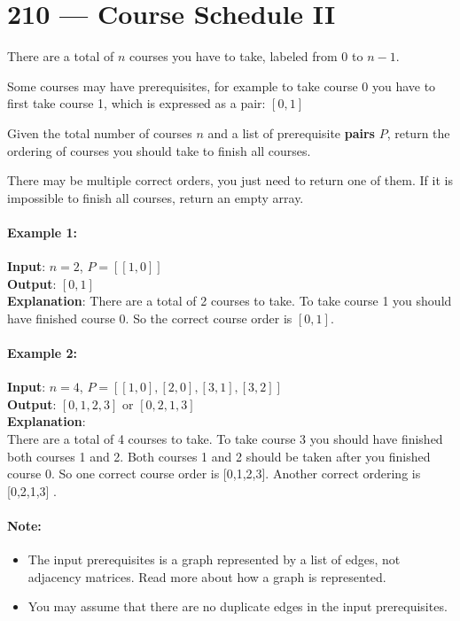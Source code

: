 \section{210 --- Course Schedule II}
There are a total of $n$ courses you have to take, labeled from 0 to $n-1$.

Some courses may have prerequisites, for example to take course 0 you have to first take course 1, which is expressed as a pair: $[0,1]$

Given the total number of courses $n$ and a list of prerequisite \textbf{pairs} $P$, return the ordering of courses you should take to finish all courses.

There may be multiple correct orders, you just need to return one of them. If it is impossible to finish all courses, return an empty array.

\paragraph{Example 1:}
\begin{flushleft}
\textbf{Input}: $n=2$, $P=[[1,0]]$
\\
\textbf{Output}: $[0,1]$
\\
\textbf{Explanation}: There are a total of 2 courses to take. To take course 1 you should have finished  course 0. So the correct course order is $[0,1]$.
\end{flushleft}
\paragraph{Example 2:}
\begin{flushleft}
\textbf{Input}: $n=4$, $P=[[1,0],[2,0],[3,1],[3,2]]$
\\
\textbf{Output}: $[0,1,2,3]$ or $[0,2,1,3]$
\\
\textbf{Explanation}: 
\\
There are a total of 4 courses to take. To take course 3 you should have finished both courses 1 and 2. Both courses 1 and 2 should be taken after you finished course 0. So one correct course order is [0,1,2,3]. Another correct ordering is [0,2,1,3] .
\end{flushleft}
\paragraph{Note:}
\begin{itemize}
    \item The input prerequisites is a graph represented by a list of edges, not adjacency matrices. Read more about how a graph is represented.
    \item You may assume that there are no duplicate edges in the input prerequisites.
\end{itemize}
